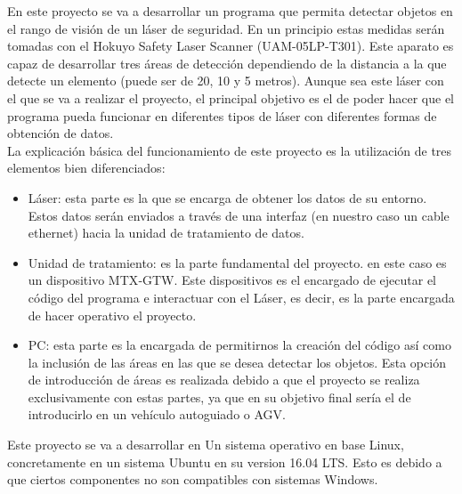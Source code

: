 
En este proyecto se va a desarrollar un programa que permita detectar objetos en el rango de visión de un láser de seguridad. En un principio estas medidas serán tomadas con el Hokuyo Safety Laser Scanner (UAM-05LP-T301). Este aparato es capaz de desarrollar tres áreas de detección dependiendo de la distancia a la que detecte un elemento (puede ser de 20, 10 y 5 metros). Aunque sea este láser con el que se va a realizar el proyecto, el principal objetivo es el de poder hacer que el programa pueda funcionar en diferentes tipos de láser con diferentes formas de obtención de datos.\\
La explicación básica del funcionamiento de este proyecto es la utilización de tres elementos bien diferenciados:
\begin{itemize}
    \item Láser: esta parte es la que se encarga de obtener los datos de su entorno. Estos datos serán enviados a través de una interfaz (en nuestro caso un cable ethernet) hacia la unidad de tratamiento de datos.
    \item Unidad de tratamiento: es la parte fundamental del  proyecto. en este caso es un dispositivo MTX‐GTW. Este dispositivos es el encargado de ejecutar el código del programa e interactuar con el Láser, es decir, es la parte encargada de hacer operativo el proyecto.
    \item PC: esta parte es la encargada de permitirnos la creación del código así como la inclusión de las áreas en las que se desea detectar los objetos. Esta opción de introducción de áreas es realizada debido a que el proyecto se realiza exclusivamente con estas partes, ya que en su objetivo final sería el de introducirlo en un vehículo autoguiado o AGV.\\
\end{itemize}
Este proyecto se va a desarrollar en Un sistema operativo en base Linux, concretamente en un sistema Ubuntu en su version 16.04 LTS. Esto es debido a que ciertos componentes no son compatibles con sistemas  Windows.\\

